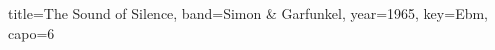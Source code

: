 \documentclass{skrul-leadsheet}
\begin{document}
\begin{song}[transpose-capo=true]{title={The Sound of Silence}, band={Simon \& Garfunkel}, year={1965}, key={Ebm}, capo={6}}



\end{song}
\end{document}
